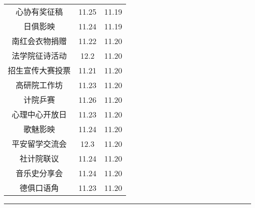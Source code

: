 \documentclass[letterpaper, 12pt]{article}
\begin{document}
\begin{multicols}{2}
{\begin{longtable}{|c|c|c|}
    心协有奖征稿 & 11.25 & 11.19\\
    日俱影映 & 11.24 & 11.19\\
    南红会衣物捐赠 & 11.22 & 11.20\\
    法学院征诗活动 & 12.2 & 11.20\\
    招生宣传大赛投票 & 11.21 & 11.20\\
    高研院工作坊 & 11.23 & 11.20\\
    计院乒赛 & 11.26 & 11.20\\
    心理中心开放日 & 11.23 & 11.20\\
    歌魅影映 & 11.24 & 11.20\\
    平安留学交流会 & 12.3 & 11.20\\
    社计院联议 & 11.24 & 11.20\\
    音乐史分享会 & 11.24 & 11.20\\
    德俱口语角 & 11.23 & 11.20\\
    \hline
\end{longtable}
\unskip
\unpenalty
\unpenalty}\unvbox\colbbox
\end{multicols}
\hrule
\pagebreak
\end{document}
